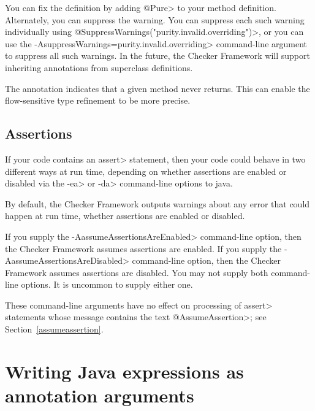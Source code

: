 You can fix the definition by adding \<@Pure> to your method definition.
Alternately, you can suppress the warning.
You can suppress each such warning individually using
\<@SuppressWarnings("purity.invalid.overriding")>,
or you can use the \<-AsuppressWarnings=purity.invalid.overriding>
command-line argument to suppress all such warnings.
In the future, the Checker Framework will support inheriting annotations
from superclass definitions.



The  annotation
indicates that a given method never returns.  This can enable the
flow-sensitive type refinement to be more precise.


\subsection{Assertions\label{type-refinement-assertions}}

If your code contains an \<assert> statement, then your code could behave
in two different ways at run time, depending on whether assertions are
enabled or disabled
via the \<-ea> or \<-da> command-line options to java.

By default, the Checker Framework outputs warnings about any error that
could happen at run time, whether assertions are enabled or disabled.

If you supply the \<-AassumeAssertionsAreEnabled> command-line option, then
the Checker Framework assumes assertions are enabled.  If you supply the
\<-AassumeAssertionsAreDisabled> command-line option, then the Checker
Framework assumes assertions are disabled.  You may not supply both
command-line options.  It is uncommon to supply either one.

These command-line arguments have no effect on processing of \<assert>
statements whose message contains the text \<@AssumeAssertion>; see
Section~\ref{assumeassertion}.


\section{Writing Java expressions as annotation arguments\label{java-expressions-as-arguments}}

